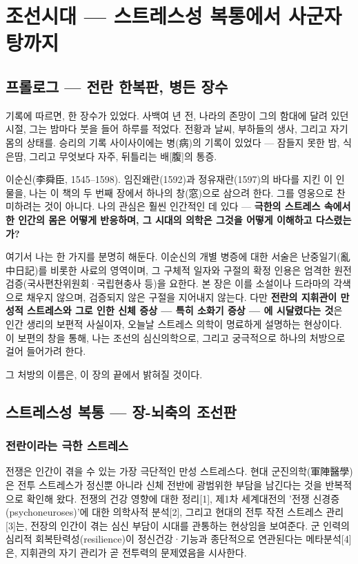 \documentclass[11pt,oneside]{book}
\begin{document}

\chapter{조선시대 — 스트레스성 복통에서 사군자탕까지}

\section{프롤로그 — 전란 한복판, 병든 장수}
기록에 따르면, 한 장수가 있었다. 사백여 년 전, 나라의 존망이 그의 함대에 달려 있던 시절, 그는 밤마다 붓을 들어 하루를 적었다. 전황과 날씨, 부하들의 생사, 그리고 자기 몸의 상태를. 승리의 기록 사이사이에는 병(病)의 기록이 있었다 — 잠들지 못한 밤, 식은땀, 그리고 무엇보다 자주, 뒤틀리는 배[腹]의 통증.

이순신(李舜臣, 1545–1598). 임진왜란(1592)과 정유재란(1597)의 바다를 지킨 이 인물을, 나는 이 책의 두 번째 장에서 하나의 창(窓)으로 삼으려 한다. 그를 영웅으로 찬미하려는 것이 아니다. 나의 관심은 훨씬 인간적인 데 있다 — \textbf{극한의 스트레스 속에서 한 인간의 몸은 어떻게 반응하며, 그 시대의 의학은 그것을 어떻게 이해하고 다스렸는가?}

여기서 나는 한 가지를 분명히 해둔다. 이순신의 개별 병증에 대한 서술은 난중일기(亂中日記)를 비롯한 사료의 영역이며, 그 구체적 일자와 구절의 확정 인용은 엄격한 원전 검증(국사편찬위원회·국립현충사 등)을 요한다. 본 장은 이를 소설이나 드라마의 각색으로 채우지 않으며, 검증되지 않은 구절을 지어내지 않는다. 다만 \textbf{전란의 지휘관이 만성적 스트레스와 그로 인한 신체 증상 — 특히 소화기 증상 — 에 시달렸다는 것}은 인간 생리의 보편적 사실이자, 오늘날 스트레스 의학이 명료하게 설명하는 현상이다. 이 보편의 창을 통해, 나는 조선의 심신의학으로, 그리고 궁극적으로 하나의 처방으로 걸어 들어가려 한다.

그 처방의 이름은, 이 장의 끝에서 밝혀질 것이다.

\section{스트레스성 복통 — 장-뇌축의 조선판}
\subsection{전란이라는 극한 스트레스}
전쟁은 인간이 겪을 수 있는 가장 극단적인 만성 스트레스다. 현대 군진의학(軍陣醫學)은 전투 스트레스가 정신뿐 아니라 신체 전반에 광범위한 부담을 남긴다는 것을 반복적으로 확인해 왔다. 전쟁의 건강 영향에 대한 정리[1], 제1차 세계대전의 '전쟁 신경증(psychoneuroses)'에 대한 의학사적 분석[2], 그리고 현대의 전투 작전 스트레스 관리[3]는, 전장의 인간이 겪는 심신 부담이 시대를 관통하는 현상임을 보여준다. 군 인력의 심리적 회복탄력성(resilience)이 정신건강·기능과 종단적으로 연관된다는 메타분석[4]은, 지휘관의 자기 관리가 곧 전투력의 문제였음을 시사한다.
\end{document}
